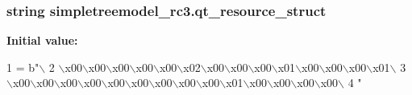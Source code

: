 \subsubsection[{qt\+\_\+resource\+\_\+struct}]{\setlength{\rightskip}{0pt plus 5cm}string simpletreemodel\+\_\+rc3.\+qt\+\_\+resource\+\_\+struct}\label{namespacesimpletreemodel__rc3_a0599b69a80b1a287f6b87b2817992a3b}
{\bfseries Initial value\+:}
\begin{DoxyCode}
1 = b\textcolor{stringliteral}{"\(\backslash\)}
2 \textcolor{stringliteral}{\(\backslash\)x00\(\backslash\)x00\(\backslash\)x00\(\backslash\)x00\(\backslash\)x00\(\backslash\)x02\(\backslash\)x00\(\backslash\)x00\(\backslash\)x00\(\backslash\)x01\(\backslash\)x00\(\backslash\)x00\(\backslash\)x00\(\backslash\)x01\(\backslash\)}
3 \textcolor{stringliteral}{\(\backslash\)x00\(\backslash\)x00\(\backslash\)x00\(\backslash\)x00\(\backslash\)x00\(\backslash\)x00\(\backslash\)x00\(\backslash\)x00\(\backslash\)x00\(\backslash\)x01\(\backslash\)x00\(\backslash\)x00\(\backslash\)x00\(\backslash\)x00\(\backslash\)}
4 \textcolor{stringliteral}{"}
\end{DoxyCode}
